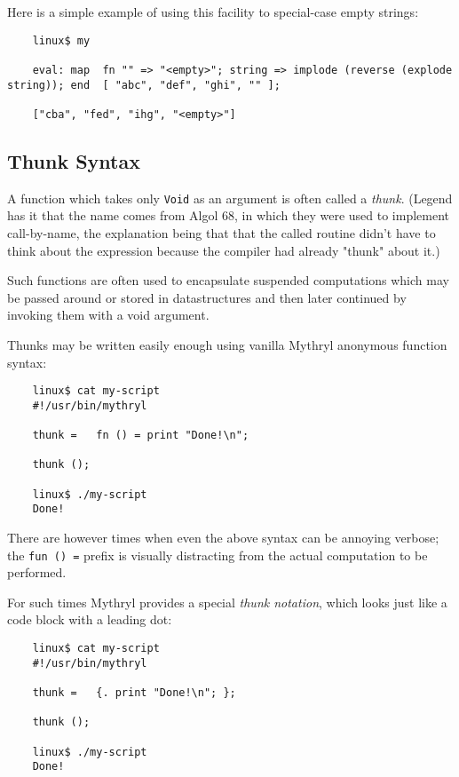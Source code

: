 Here is a simple example of using this facility to special-case empty strings:

\begin{verbatim}
    linux$ my

    eval: map  fn "" => "<empty>"; string => implode (reverse (explode string)); end  [ "abc", "def", "ghi", "" ];

    ["cba", "fed", "ihg", "<empty>"]
\end{verbatim}


\cutend*


\subsection{Thunk Syntax}
\label{section:ref:functions:thunk-syntax}

A function which takes only {\tt Void} as an argument  
is often called a {\it thunk}.  (Legend has it that 
the name comes from Algol 68, in which they were 
used to implement call-by-name, the explanation 
being that that the called routine didn't have to 
think about the expression because the compiler had 
already "thunk" about it.)

Such functions are 
often used to encapsulate suspended computations which 
may be passed around or stored in datastructures and 
then later continued by invoking them with a void 
argument.

Thunks may be written easily enough using vanilla 
Mythryl anonymous function syntax:

\begin{verbatim}
    linux$ cat my-script
    #!/usr/bin/mythryl

    thunk =   fn () = print "Done!\n";

    thunk ();

    linux$ ./my-script
    Done!
\end{verbatim}

There are however times when even the above syntax can be 
annoying verbose;  the {\tt fun () =} prefix is visually 
distracting from the actual computation to be performed.

For such times Mythryl provides a special {\it thunk notation}, 
which looks just like a code block with a leading dot:

\begin{verbatim}
    linux$ cat my-script
    #!/usr/bin/mythryl

    thunk =   {. print "Done!\n"; };

    thunk ();

    linux$ ./my-script
    Done!
\end{verbatim}

